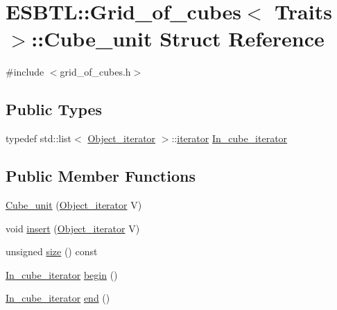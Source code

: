 \hypertarget{structESBTL_1_1Grid__of__cubes_1_1Cube__unit}{}\section{E\+S\+B\+TL\+:\+:Grid\+\_\+of\+\_\+cubes$<$ Traits $>$\+:\+:Cube\+\_\+unit Struct Reference}
\label{structESBTL_1_1Grid__of__cubes_1_1Cube__unit}


{\ttfamily \#include $<$grid\+\_\+of\+\_\+cubes.\+h$>$}

\subsection*{Public Types}
\begin{DoxyCompactItemize}
\item 
typedef std\+::list$<$ \hyperlink{structESBTL_1_1Grid__of__cubes_ae77665f05d6c7ae05c3d2d764df99193}{Object\+\_\+iterator} $>$\+::\hyperlink{classESBTL_1_1Grid__of__cubes_1_1iterator}{iterator} \hyperlink{structESBTL_1_1Grid__of__cubes_1_1Cube__unit_a9a5e21b8376bdeb122987e83f89b3c06}{In\+\_\+cube\+\_\+iterator}
\end{DoxyCompactItemize}
\subsection*{Public Member Functions}
\begin{DoxyCompactItemize}
\item 
\hyperlink{structESBTL_1_1Grid__of__cubes_1_1Cube__unit_a8ca11ade3d86e7824fc4223441e8b37c}{Cube\+\_\+unit} (\hyperlink{structESBTL_1_1Grid__of__cubes_ae77665f05d6c7ae05c3d2d764df99193}{Object\+\_\+iterator} V)
\item 
void \hyperlink{structESBTL_1_1Grid__of__cubes_1_1Cube__unit_a96edfca91ff075b8f813d73049c2bb6f}{insert} (\hyperlink{structESBTL_1_1Grid__of__cubes_ae77665f05d6c7ae05c3d2d764df99193}{Object\+\_\+iterator} V)
\item 
unsigned \hyperlink{structESBTL_1_1Grid__of__cubes_1_1Cube__unit_a207c17f6be076ef8d2b5c97b743c6eec}{size} () const
\item 
\hyperlink{structESBTL_1_1Grid__of__cubes_1_1Cube__unit_a9a5e21b8376bdeb122987e83f89b3c06}{In\+\_\+cube\+\_\+iterator} \hyperlink{structESBTL_1_1Grid__of__cubes_1_1Cube__unit_aa97b50cdb4ec996c77c8f1ba52b63f4d}{begin} ()
\item 
\hyperlink{structESBTL_1_1Grid__of__cubes_1_1Cube__unit_a9a5e21b8376bdeb122987e83f89b3c06}{In\+\_\+cube\+\_\+iterator} \hyperlink{structESBTL_1_1Grid__of__cubes_1_1Cube__unit_a9a28638e4c24c8338ee60b68f5d0508b}{end} ()
\end{DoxyCompactItemize}
